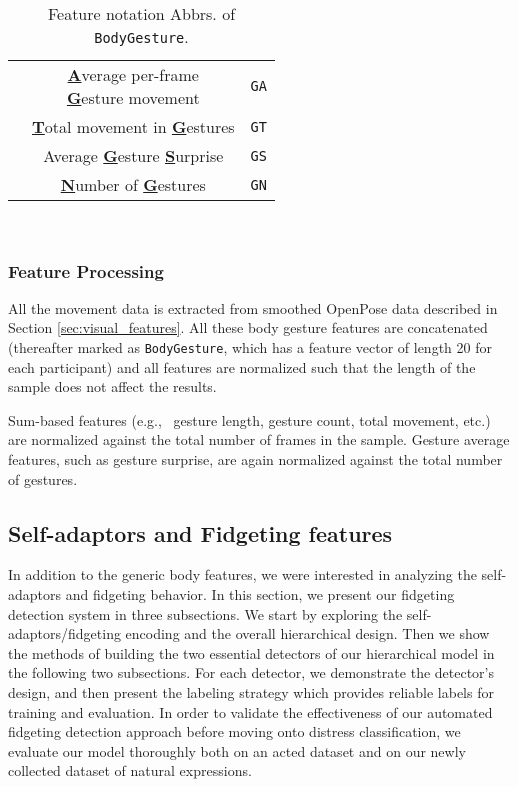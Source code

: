 \begin{table}
\begin{minipage}{.5\linewidth}
\begin{center}
\begin{tabular}{ccc}
        & \makecell{\textbf{\underline{A}}verage per-frame \\ \textbf{\underline G}esture movement} & \texttt{GA} \\ \cmidrule{2-3}
        &  \textbf{\underline T}otal movement in  \textbf{\underline G}estures & \texttt{GT} \\ \cmidrule{2-3}
        & Average  \textbf{\underline G}esture  \textbf{\underline S}urprise & \texttt{GS} \\ \cmidrule{2-3}
        & \textbf{\underline{N}}umber of  \textbf{\underline G}estures & \texttt{GN} \\
        \bottomrule
      \end{tabular}
    \end{center}
  \end{minipage}
  \\
  \caption{Feature notation Abbrs. of \texttt{BodyGesture}.}
  \label{table:results-feature-notation-mapping}
\end{table}

\subsubsection{Feature Processing}
All the movement data is extracted from smoothed OpenPose data described in Section \ref{sec:visual_features}. All these body gesture features are concatenated (thereafter marked as \texttt{BodyGesture}, which has a feature vector of length 20 for each participant) and all features are normalized such that the length of the sample does not affect the results.

Sum-based features (e.g., \ gesture length, gesture count, total movement, etc.) are normalized against
the total number of frames in the sample.
Gesture average features, such as gesture surprise, are again normalized against the total number of gestures.

 

\subsection{Self-adaptors and Fidgeting features}\label{sec:automatic_fidget_detection}
In addition to the generic body features, we were interested in analyzing the self-adaptors and fidgeting behavior. In this section, we present our fidgeting detection system in three subsections. We start by exploring the self-adaptors/fidgeting encoding and the overall hierarchical design. Then we show the methods of building the two essential detectors of our hierarchical model in the following two subsections. For each detector, we demonstrate the detector's design, and then present the labeling strategy which provides reliable labels for training and evaluation. In order to validate the effectiveness of our automated fidgeting detection approach before moving onto distress classification, we evaluate our model thoroughly both on an acted dataset and on our newly collected dataset of natural expressions.

